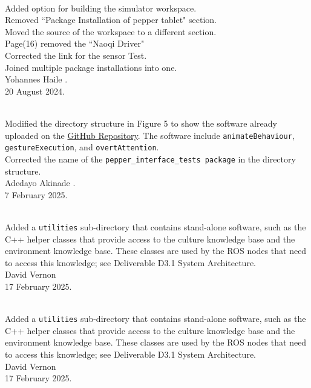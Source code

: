 \documentclass{CSSRforAfrica}
\begin{document}
{\begin{description}
			\newpage
			
			\item [Version 1.5]~\\
			Added option for building the simulator workspace.\\
			Removed ``Package Installation of pepper tablet" section.\\
			Moved the source of the workspace to a different section.\\
			Page(16) removed the ``Naoqi Driver" \\
			Corrected the link for the sensor Test. \\
			Joined multiple package installations into one.\\
			Yohannes Haile .\\
			20 August 2024.
			
			\item [Version 1.6]~\\
			Modified the directory structure in Figure 5 to show the software already uploaded on the \href{https://github.com/cssr4africa/cssr4africa} {GitHub Repository}.
			The software include \texttt{animateBehaviour}, \texttt{gestureExecution}, and \texttt{overtAttention}.\\
			Corrected the name of the \texttt{pepper\_interface\_tests package} in the directory structure.\\
			Adedayo Akinade .\\
			7 February 2025.
			
			\item [Version 1.7]~\\
			Added a {\small \tt utilities} sub-directory that contains stand-alone software, such as the C++ helper classes that provide access to the culture knowledge base and the environment knowledge base. These classes are used by the ROS nodes that need to access this knowledge; see Deliverable D3.1 System Architecture.\\
			David Vernon \\       
			17 February 2025.
			
			\item [Version 1.7]~\\
			Added a {\small \tt utilities} sub-directory that contains stand-alone software, such as the C++ helper classes that provide access to the culture knowledge base and the environment knowledge base. These classes are used by the ROS nodes that need to access this knowledge; see Deliverable D3.1 System Architecture.\\
			David Vernon \\       
			17 February 2025.
			

\end{description}}
\end{document}
